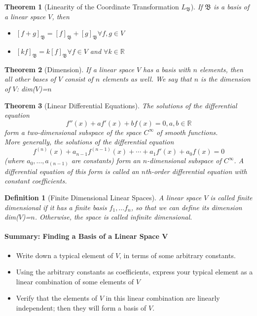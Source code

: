 \documentclass[10pt]{report}
\newtheorem{thm2}{Theorem}[section]
\newtheorem{def2}{Definition}[section]
\begin{document}
\begin{thm2}[Linearity of the Coordinate Transformation $L_\mathfrak{B}$]
If $\mathfrak{B}$ is a basis of a linear space $V$, then
\begin{itemize}
\item[a.] $[f+g]_\mathfrak{B} = [f]_\mathfrak{B} + [g]_\mathfrak{B} \forall f,g \in V$
\item[b.] $[kf]_\mathfrak{B} = k[f]_\mathfrak{B} \forall f\in V$ and $\forall k \in \mathbb{R}$
\end{itemize}
\end{thm2}
\begin{thm2}[Dimension]
If a linear space $V$ has a basis with $n$ elements, then all other bases of $V$ consist of $n$ elements as well. We say that $n$ is the dimension of $V$: dim($V$)=$n$
\end{thm2}
\begin{thm2}[Linear Differential Equations]
The solutions of the differential equation
$$f''(x)+af'(x)+bf(x)=0, a,b\in \mathbb{R}$$
form a two-dimensional subspace of the space $C^{\infty}$ of smooth functions.\\ More generally, the solutions of the differential equation
$$f^{(n)}(x)+a_{n-1}f^{(n-1)}(x)+\cdots +a_1f'(x)+a_0f(x)=0$$
(where $a_0,...,a_{(n-1)}$ are constants) form an $n$-dimensional subspace of $C^\infty$. A differential equation of this form is called an $n$th-order differential equation with constant coefficients.
\end{thm2}
\begin{def2}[Finite Dimensional Linear Spaces]
A linear space $V$ is called finite dimensional if it has a finite basis $f_1,...f_n$, so that we can define its dimension dim($V$)=$n$. Otherwise, the space is called infinite dimensional. 
\end{def2}
\paragraph{Summary: Finding a Basis of a Linear Space V}
\begin{itemize}
\item[a.] Write down a typical element of $V$, in terms of some arbitrary constants.
\item[b.] Using the arbitrary constants as coefficients, express your typical element as a linear combination of some elements of $V$
\item[c.] Verify that the elements of $V$ in this linear combination are linearly independent; then they will form a basis of $V$.
\end{itemize}
\end{document}
